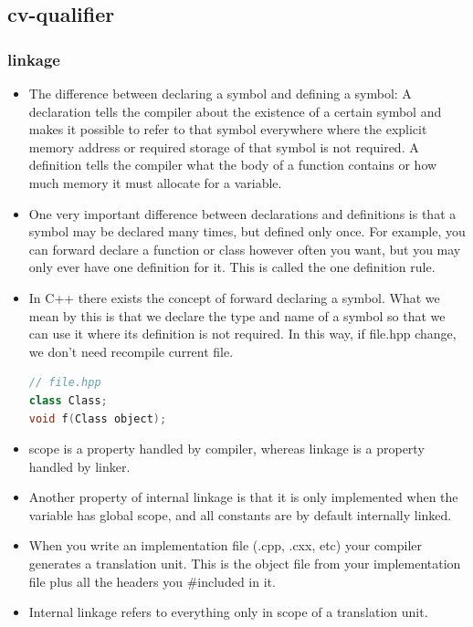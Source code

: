 \documentclass[a4paper,12pt,twoside]{book}
\begin{document}
\subsection{cv-qualifier}
\subsubsection{linkage}
\begin{itemize}

\item The difference between declaring a symbol and defining a symbol: A declaration tells the compiler about the existence of a certain symbol and makes it possible to refer to that symbol everywhere where the explicit memory address or required storage of that symbol is not required. A definition tells the compiler what the body of a function contains or how much memory it must allocate for a variable.

\item One very important difference between declarations and definitions is that a symbol may be declared many times, but defined only once. For example, you can forward declare a function or class however often you want, but you may only ever have one definition for it. This is called the one definition rule.

\item In C++ there exists the concept of forward declaring a symbol. What we mean by this is that we declare the type and name of a symbol so that we can use it where its definition is not required. In this way, if file.hpp change, we don't need recompile current file. 
\begin{lstlisting}[frame=single, language=c++]
// file.hpp
class Class;
void f(Class object);
\end{lstlisting}

\item scope is a property handled by compiler, whereas linkage is a property handled by linker.

\item Another property of internal linkage is that it is only implemented when the variable has global scope, and all constants are by default internally linked.

\item When you write an implementation file (.cpp, .cxx, etc) your compiler generates a translation unit. This is the object file from your implementation file plus all the headers you \#included in it.

\item Internal linkage refers to everything only in scope of a translation unit.


\end{itemize}
\end{document}
